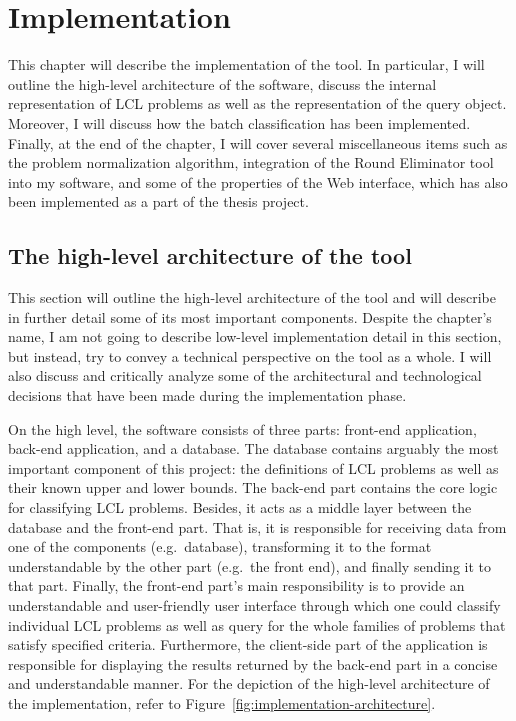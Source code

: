 \chapter{Implementation}
\label{chapter:implementation}

This chapter will describe the implementation of the tool.
In particular, I will outline the high-level architecture of
the software, discuss the internal representation of
LCL problems as well as the representation of the query object.
Moreover, I will discuss how the batch classification has been
implemented. Finally, at the end of the chapter, I will cover
several miscellaneous items such as the problem normalization
algorithm, integration of the Round Eliminator tool into
my software, and some of the properties of the Web interface,
which has also been implemented as a part of the thesis project.

\section{The high-level architecture of the tool}

This section will outline the high-level architecture of the tool and
will describe in further detail some of its most important
components. Despite the chapter's name, I am not going
to describe low-level implementation detail in this section,
but instead, try to convey a technical perspective on the tool
as a whole. I will also discuss and critically analyze some
of the architectural and technological decisions that have been
made during the implementation phase.

On the high level, the software consists of three parts:
front-end application, back-end application, and a database.
The database contains arguably the most important component
of this project: the definitions of LCL problems as well as their
known upper and lower bounds. The back-end part contains
the core logic for classifying LCL problems. Besides, it acts
as a middle layer between the database and the front-end part.
That is, it is responsible for receiving data from one of the
components (e.g.\ database), transforming it to the
format understandable by the other part (e.g.\ the front end),
and finally sending it to that part. Finally, the
front-end part's main responsibility is to provide
an understandable and user-friendly user interface
through which one could classify individual LCL problems
as well as query for the whole families of problems
that satisfy specified criteria. Furthermore,
the client-side part of the application is
responsible for displaying the results returned by the
back-end part in a concise and understandable manner.
For the depiction of the high-level architecture of the
implementation, refer to Figure~\ref{fig:implementation-architecture}.

